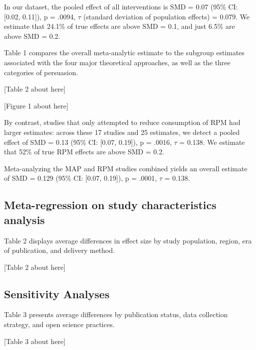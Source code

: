 \documentclass[sn-nature,referee,pdflatex]{sn-jnl}
\begin{document}
In our dataset, the pooled effect of all interventions is SMD = 0.07
(95\% CI: {[}0.02, 0.11{]}), p = .0094, \(\tau\) (standard deviation of
population effects) = 0.079. We estimate that 24.1\% of true effects are
above SMD = 0.1, and just 6.5\% are above SMD = 0.2.

Table 1 compares the overall meta-analytic estimate to the subgroup
estimates associated with the four major theoretical approaches, as well
as the three categories of persuasion.

\begin{center}
[Table 2 about here]
\end{center}
\begin{center}
[Figure 1 about here]
\end{center}

By contrast, studies that only attempted to reduce consumption of RPM
had larger estimates: across these 17 studies and 25 estimates, we
detect a pooled effect of SMD = 0.13 (95\% CI: {[}0.07, 0.19{]}), p =
.0016, \(\tau\) = 0.138. We estimate that 52\% of true RPM effects are
above SMD = 0.2.

Meta-analyzing the MAP and RPM studies combined yields an overall
estimate of SMD = 0.129 (95\% CI: {[}0.07, 0.19{]}), p = .0001, \(\tau\)
= 0.138.

\subsection{Meta-regression on study characteristics
analysis}\label{sec2.4}

Table 2 displays average differences in effect size by study population,
region, era of publication, and delivery method.

\begin{center}
[Table 2 about here]
\end{center}

\subsection{Sensitivity Analyses}\label{sec2.5}

Table 3 presents average differences by publication status, data
collection strategy, and open science practices.

\begin{center}
[Table 3 about here]
\end{center}

\begin{comment}
The meta-analytic mean corrected for publication bias [@hedges1992], which assumes that significant, positive results are twice as likely to be published as anything else, is SMD = r pub_bias_estimate (95%
\end{comment}
\end{document}
